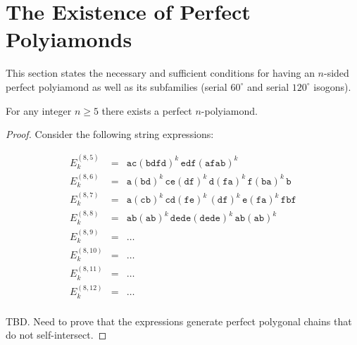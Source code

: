 \documentclass[utf8]{bjmc}
\begin{document}



\section{The Existence of Perfect Polyiamonds}

This section states the necessary and sufficient conditions for 
having an $n$-sided perfect polyiamond as well as its subfamilies
(serial $60^{\circ}$ and serial $120^{\circ}$ isogons).

\begin{theorem}
For any integer $n \geq 5$ there exists a perfect $n$-polyiamond.
\end{theorem}




\begin{proof}

Consider the following string expressions: 

\[
\begin{array}{ccl}
E^{(8,5)}_k & = & \mathtt{ac}(\mathtt{bdfd})^k\,\mathtt{edf}(\mathtt{afab})^k \\
E^{(8,6)}_k & = & \mathtt{a}(\mathtt{bd})^k\,\mathtt{ce}(\mathtt{df})^k\,\mathtt{d}(\mathtt{fa})^k\,\mathtt{f}(\mathtt{ba})^k\,\mathtt{b} \\
E^{(8,7)}_k & = & \mathtt{a}(\mathtt{cb})^k\,\mathtt{cd}(\mathtt{fe})^k\,\mathtt{(df)}^k\,\mathtt{e}(\mathtt{fa})^k\,\mathtt{fbf} \\
E^{(8,8)}_k & = & \mathtt{ab}(\mathtt{ab})^k\,\mathtt{dede}(\mathtt{dede})^k\,\mathtt{ab}(\mathtt{ab})^k \\
E^{(8,9)}_k & = & \ldots \\
E^{(8,10)}_k & = & \ldots \\
E^{(8,11)}_k & = & \ldots \\
E^{(8,12)}_k & = & \ldots \\
\end{array}
\]

TBD. Need to prove that the expressions generate perfect polygonal chains that do not self-intersect. 
\end{proof}
\end{document}
